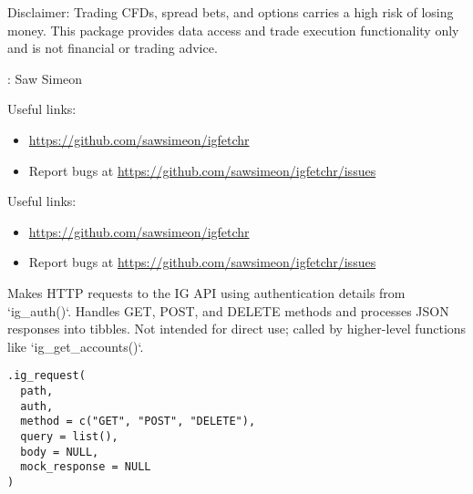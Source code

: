 \documentclass[a4paper]{book}
\begin{document}
%
\begin{Details}
Disclaimer: Trading CFDs, spread bets, and options carries a high risk of losing money.
This package provides data access and trade execution functionality only and is not
financial or trading advice.
\end{Details}
%
\begin{Author}
: Saw Simeon 

\end{Author}
%
\begin{SeeAlso}
Useful links:
\begin{itemize}

\item{} \url{https://github.com/sawsimeon/igfetchr}
\item{} Report bugs at \url{https://github.com/sawsimeon/igfetchr/issues}

\end{itemize}



Useful links:
\begin{itemize}

\item{} \url{https://github.com/sawsimeon/igfetchr}
\item{} Report bugs at \url{https://github.com/sawsimeon/igfetchr/issues}

\end{itemize}


\end{SeeAlso}
%
\begin{Description}
Makes HTTP requests to the IG API using authentication details from `ig\_auth()`.
Handles GET, POST, and DELETE methods and processes JSON responses into tibbles.
Not intended for direct use; called by higher-level functions like `ig\_get\_accounts()`.
\end{Description}
%
\begin{Usage}
\begin{verbatim}
.ig_request(
  path,
  auth,
  method = c("GET", "POST", "DELETE"),
  query = list(),
  body = NULL,
  mock_response = NULL
)
\end{verbatim}
\end{Usage}
%
\end{document}
